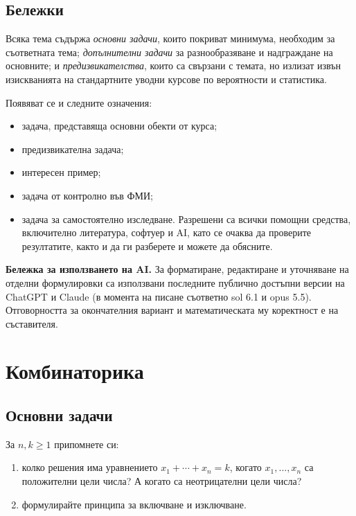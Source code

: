 \documentclass[11pt,a4paper]{article}
\newenvironment{enumeratea}{\begin{enumerate}[label=(\alph*),itemsep=0.28em,topsep=0.25em]}{\end{enumerate}}
\newcounter{problem}[section]
\begin{document}
\setcounter{tocdepth}{1}
\tableofcontents

\subsection*{Бележки}

Всяка тема съдържа \emph{основни задачи}, които покриват минимума,
необходим за съответната тема; \emph{допълнителни задачи} за разнообразяване
и надграждане на основните; и \emph{предизвикателства}, които са свързани
с темата, но излизат извън изискванията на стандартните уводни курсове
по вероятности и статистика.

Появяват се и следните означения:
\begin{itemize}
  \item[\faBook] задача, представяща основни обекти от курса;
  \item[\faStar] предизвикателна задача;
  \item[\faSmile] интересен пример;
  \item[\faPencil*] задача от контролно във ФМИ;
  \item[\faRobot] задача за самостоятелно изследване. Разрешени са всички
  помощни средства, включително литература, софтуер и AI, като се очаква да проверите резултатите, както и
  да ги разберете и можете да обясните.
\end{itemize}


{\small
\textbf{Бележка за използването на AI.}
За форматиране, редактиране и уточняване на отделни формулировки
са използвани последните публично достъпни версии на ChatGPT и Claude (в момента на писане съответно sol 6.1  и opus 5.5).
Отговорността за окончателния вариант и математическата му коректност
е на съставителя.
}

\section{Комбинаторика}

\subsection*{Основни задачи}

\begin{problembook}
За $n,k\ge 1$ припомнете си:
\begin{enumeratea}
  \item колко решения има уравнението $x_1+\cdots+x_n=k$, когато
  $x_1,\dots,x_n$ са положителни цели числа? А когато са неотрицателни цели числа?
  \item формулирайте принципа за включване и изключване.
\end{enumeratea}
\end{problembook}
\end{document}
